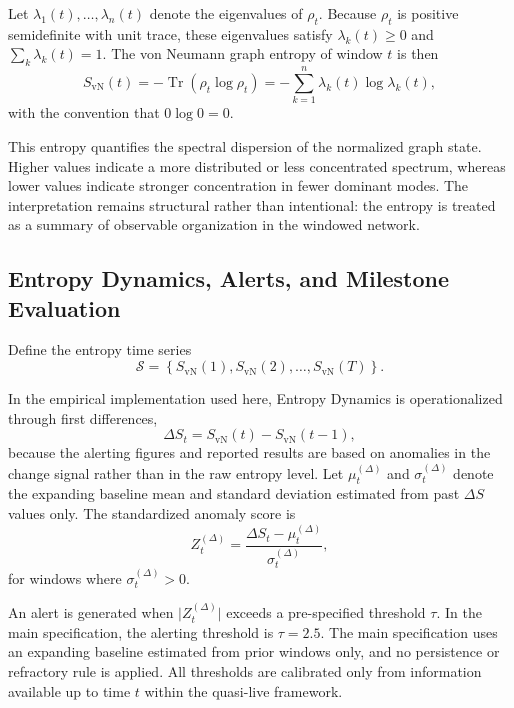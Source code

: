 \documentclass[sigconf]{acmart}
\begin{document}
Let $\lambda_1(t), \dots, \lambda_n(t)$ denote the eigenvalues of $\rho_t$. Because $\rho_t$ is positive semidefinite with unit trace, these eigenvalues satisfy $\lambda_k(t) \ge 0$ and $\sum_k \lambda_k(t) = 1$. The von Neumann graph entropy of window $t$ is then
\begin{equation}
S_{\mathrm{vN}}(t) = - \operatorname{Tr}(\rho_t \log \rho_t)
= - \sum_{k=1}^{n} \lambda_k(t) \log \lambda_k(t),
\end{equation}
with the convention that $0 \log 0 = 0$.

This entropy quantifies the spectral dispersion of the normalized graph state. Higher values indicate a more distributed or less concentrated spectrum, whereas lower values indicate stronger concentration in fewer dominant modes. The interpretation remains structural rather than intentional: the entropy is treated as a summary of observable organization in the windowed network.

\subsection{Entropy Dynamics, Alerts, and Milestone Evaluation}

Define the entropy time series
\begin{equation}
\mathcal{S} = \left\{S_{\mathrm{vN}}(1), S_{\mathrm{vN}}(2), \dots, S_{\mathrm{vN}}(T)\right\}.
\end{equation}

In the empirical implementation used here, Entropy Dynamics is operationalized through first differences,
\begin{equation}
\Delta S_t = S_{\mathrm{vN}}(t) - S_{\mathrm{vN}}(t-1),
\end{equation}
because the alerting figures and reported results are based on anomalies in the change signal rather than in the raw entropy level. Let $\mu_t^{(\Delta)}$ and $\sigma_t^{(\Delta)}$ denote the expanding baseline mean and standard deviation estimated from past $\Delta S$ values only. The standardized anomaly score is
\begin{equation}
Z_t^{(\Delta)} = \frac{\Delta S_t - \mu_t^{(\Delta)}}{\sigma_t^{(\Delta)}},
\end{equation}
for windows where $\sigma_t^{(\Delta)} > 0$.

An alert is generated when $\lvert Z_t^{(\Delta)} \rvert$ exceeds a pre-specified threshold $\tau$. In the main specification, the alerting threshold is $\tau = 2.5$. The main specification uses an expanding baseline estimated from prior windows only, and no persistence or refractory rule is applied. All thresholds are calibrated only from information available up to time $t$ within the quasi-live framework.
\end{document}
